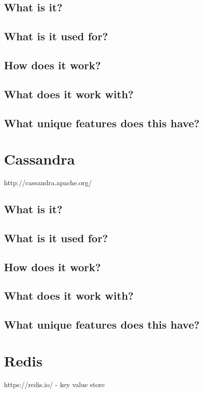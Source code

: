 \section{What is it?}

\section{What is it used for?}

\section{How does it work?}

\section{What does it work with?}

\section{What unique features does this have?}


\chapter{Cassandra}
http://cassandra.apache.org/

\section{What is it?}

\section{What is it used for?}

\section{How does it work?}

\section{What does it work with?}

\section{What unique features does this have?}


\chapter{Redis}
https://redis.io/
- key value store

